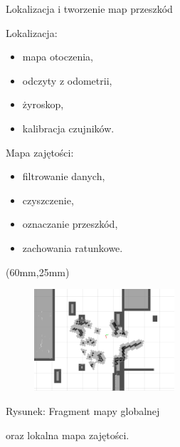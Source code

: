 \documentclass[xcolor=x11names,compress]{beamer}
\renewcommand{\(}{\begin{columns}}
\renewcommand{\)}{\end{columns}}
\newcommand{\<}[1]{\begin{column}{#1}}
\renewcommand{\>}{\end{column}}
\begin{document}
\begin{frame}{Lokalizacja i tworzenie map przeszkód}

\alert{Lokalizacja:}
\begin{itemize}
\item mapa otoczenia,
\item odczyty z odometrii,
\item żyroskop,
\item kalibracja czujników.
\end{itemize}

\vspace{0.7cm}

\alert{Mapa zajętości:}
\begin{itemize}
\item filtrowanie danych,
\item czyszczenie,
\item oznaczanie przeszkód,
\item zachowania ratunkowe.
\end{itemize}



\begin{textblock*}{70mm}(60mm,25mm)%
    \begin{minipage}[l]{70mm}%

	\begin{figure}[h!]
	\centering
	\includegraphics[width=5.2cm]{../MSc/img/costmap}
	\end{figure}

	\hspace{1cm}\scriptsize \alert{Rysunek:} Fragment mapy globalnej

	\hspace{1cm}oraz lokalna mapa zajętości.
    \end{minipage}
\end{textblock*}

\end{frame}
\end{document}
